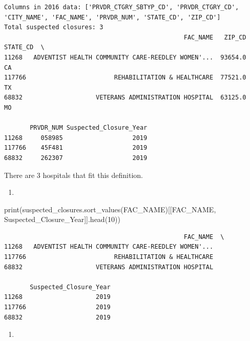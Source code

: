 \documentclass[
  letterpaper,
  DIV=11,
  numbers=noendperiod]{scrartcl}
\newenvironment{Shaded}{\begin{snugshade}}{\end{snugshade}}
\newcommand{\BuiltInTok}[1]{\textcolor[rgb]{0.00,0.23,0.31}{#1}}
\newcommand{\DecValTok}[1]{\textcolor[rgb]{0.68,0.00,0.00}{#1}}
\newcommand{\NormalTok}[1]{\textcolor[rgb]{0.00,0.23,0.31}{#1}}
\newcommand{\StringTok}[1]{\textcolor[rgb]{0.13,0.47,0.30}{#1}}
\providecommand{\tightlist}{%
  \setlength{\itemsep}{0pt}\setlength{\parskip}{0pt}}\usepackage{longtable,booktabs,array}
\begin{document}
\begin{verbatim}
Columns in 2016 data: ['PRVDR_CTGRY_SBTYP_CD', 'PRVDR_CTGRY_CD', 'CITY_NAME', 'FAC_NAME', 'PRVDR_NUM', 'STATE_CD', 'ZIP_CD']
Total suspected closures: 3
                                                 FAC_NAME   ZIP_CD STATE_CD  \
11268   ADVENTIST HEALTH COMMUNITY CARE-REEDLEY WOMEN'...  93654.0       CA   
117766                        REHABILITATION & HEALTHCARE  77521.0       TX   
68832                    VETERANS ADMINISTRATION HOSPITAL  63125.0       MO   

       PRVDR_NUM Suspected_Closure_Year  
11268     058985                   2019  
117766    45F481                   2019  
68832     262307                   2019  
\end{verbatim}

There are 3 hospitals that fit this definition.

\begin{enumerate}
\def\labelenumi{\arabic{enumi}.}
\setcounter{enumi}{1}
\tightlist
\item
\end{enumerate}

\begin{Shaded}
\begin{Highlighting}[]
\BuiltInTok{print}\NormalTok{(suspected\_closures.sort\_values(}\StringTok{\textquotesingle{}FAC\_NAME\textquotesingle{}}\NormalTok{)[[}\StringTok{\textquotesingle{}FAC\_NAME\textquotesingle{}}\NormalTok{, }\StringTok{\textquotesingle{}Suspected\_Closure\_Year\textquotesingle{}}\NormalTok{]].head(}\DecValTok{10}\NormalTok{))}
\end{Highlighting}
\end{Shaded}

\begin{verbatim}
                                                 FAC_NAME  \
11268   ADVENTIST HEALTH COMMUNITY CARE-REEDLEY WOMEN'...   
117766                        REHABILITATION & HEALTHCARE   
68832                    VETERANS ADMINISTRATION HOSPITAL   

       Suspected_Closure_Year  
11268                    2019  
117766                   2019  
68832                    2019  
\end{verbatim}

\begin{enumerate}
\def\labelenumi{\arabic{enumi}.}
\setcounter{enumi}{2}
\tightlist
\item
\end{enumerate}
\end{document}
